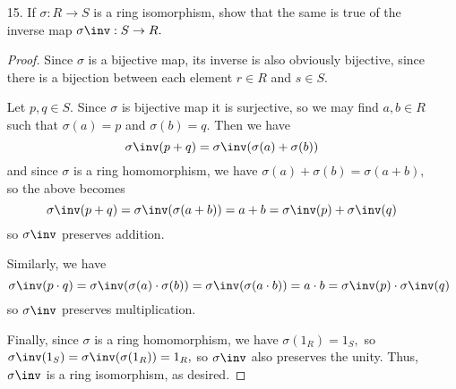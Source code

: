 \documentclass{article}
\begin{document}
\begin{itemize}
	\item[15.] If $\sigma:R\to S$ is a ring isomorphism, show that the same is true of the inverse map $\sigma\inv:S\to R.$
		\begin{proof}
			Since $\sigma$ is a bijective map, its inverse is also obviously bijective, since there is a bijection between each element $r\in R$ and $s\in S.$

			Let $p, q\in S.$ Since $\sigma$ is bijective map it is surjective, so we may find $a, b\in R$ such that $\sigma(a)=p$ and $\sigma(b)=q.$ Then we have \[\sigma\inv(p+q)=\sigma\inv(\sigma(a)+\sigma(b))\] and since $\sigma$ is a ring homomorphism, we have $\sigma(a)+\sigma(b)=\sigma(a+b),$ so the above becomes \[\sigma\inv(p+q)=\sigma\inv(\sigma(a+b))=a+b=\sigma\inv(p)+\sigma\inv(q)\] so $\sigma\inv$ preserves addition.

			Similarly, we have \[\sigma\inv(p\cdot q) = \sigma\inv(\sigma(a)\cdot \sigma(b))=\sigma\inv(\sigma(a\cdot b))=a\cdot b = \sigma\inv(p)\cdot \sigma\inv(q)\] so $\sigma\inv$ preserves multiplication.

			Finally, since $\sigma$ is a ring homomorphism, we have $\sigma(1_R)=1_S,$ so $\sigma\inv(1_S)=\sigma\inv(\sigma(1_R))=1_R,$ so $\sigma\inv$ also preserves the unity. Thus, $\sigma\inv$ is a ring isomorphism, as desired.
		\end{proof}
		
\end{itemize}
\end{document}
